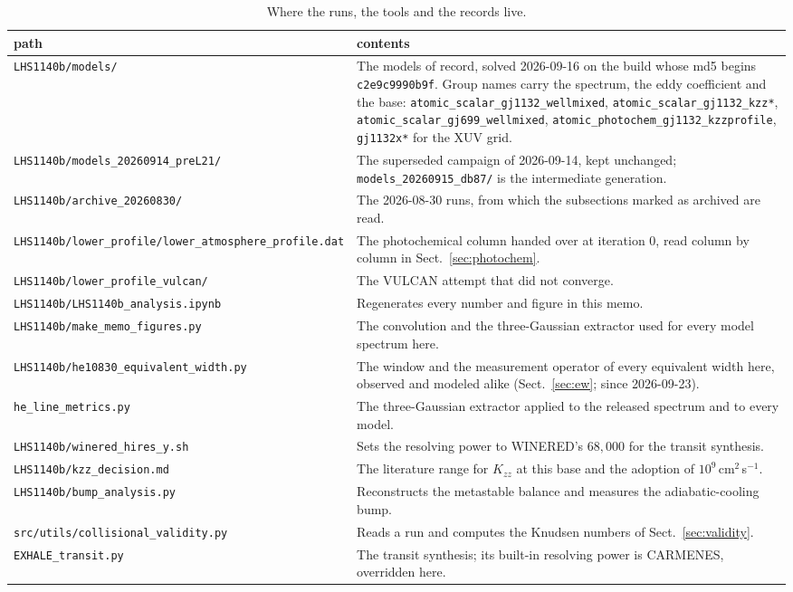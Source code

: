 \documentclass[english,a4paper]{my_memo}
\begin{document}
\begin{table}[htbp]\centering\small
\caption{Where the runs, the tools and the records live.}
\begin{tabular}{l>{\raggedright\arraybackslash}p{}}
\toprule
path & contents \\
\midrule
\texttt{LHS1140b/models/} & The models of record, solved 2026-09-16 on the
build whose md5 begins \texttt{c2e9c9990b9f}. Group names carry the spectrum,
the eddy coefficient and the base: \texttt{atomic\_scalar\_gj1132\_wellmixed},
\texttt{atomic\_scalar\_gj1132\_kzz*}, \texttt{atomic\_scalar\_gj699\_wellmixed},
\texttt{atomic\_photochem\_gj1132\_kzzprofile}, \texttt{gj1132x*} for the XUV
grid. \\
\texttt{LHS1140b/models\_20260914\_preL21/} & The superseded campaign of
2026-09-14, kept unchanged; \texttt{models\_20260915\_db87/} is the
intermediate generation. \\
\texttt{LHS1140b/archive\_20260830/} & The 2026-08-30 runs, from which the
subsections marked as archived are read. \\
\texttt{LHS1140b/lower\_profile/lower\_atmosphere\_profile.dat} & The
photochemical column handed over at iteration $0$, read column by column in
Sect.~\ref{sec:photochem}. \\
\texttt{LHS1140b/lower\_profile\_vulcan/} & The VULCAN attempt that did not
converge. \\
\texttt{LHS1140b/LHS1140b\_analysis.ipynb} & Regenerates every number and
figure in this memo. \\
\texttt{LHS1140b/make\_memo\_figures.py} & The convolution and the
three-Gaussian extractor used for every model spectrum here. \\
\texttt{LHS1140b/he10830\_equivalent\_width.py} & The window and the
measurement operator of every equivalent width here, observed and modeled
alike (Sect.~\ref{sec:ew}; since 2026-09-23). \\
\texttt{he\_line\_metrics.py} & The three-Gaussian extractor
applied to the released spectrum and to every model. \\
\texttt{LHS1140b/winered\_hires\_y.sh} & Sets the resolving power to
WINERED's $68{,}000$ for the transit synthesis. \\
\texttt{LHS1140b/kzz\_decision.md} & The literature range for $K_{zz}$ at
this base and the adoption of $10^{9}$\,cm$^2$\,s$^{-1}$. \\
\texttt{LHS1140b/bump\_analysis.py} & Reconstructs the metastable balance and
measures the adiabatic-cooling bump. \\
\texttt{src/utils/collisional\_validity.py} & Reads a run and computes the
Knudsen numbers of Sect.~\ref{sec:validity}. \\
\texttt{EXHALE\_transit.py} & The transit synthesis; its built-in resolving
power is CARMENES, overridden here. \\
\bottomrule
\end{tabular}
\end{table}
\end{document}

